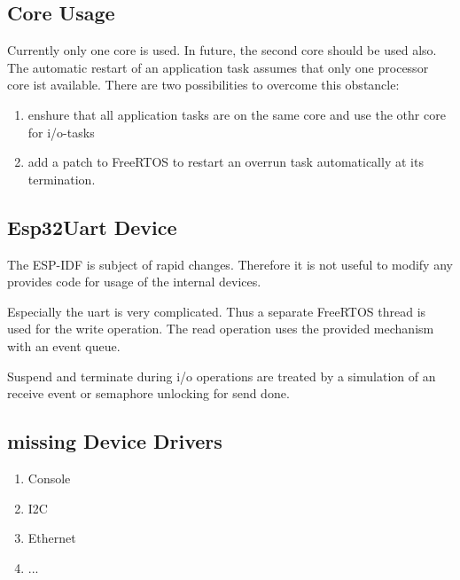 \subsection{Core Usage}
Currently only one core is used.
In future, the second core should be used also.
The automatic restart of an application task assumes that only one processor core ist 
available.
There are two possibilities to overcome this obstancle:
\begin{enumerate}
\item enshure that all application tasks are on the same core and use the othr core for i/o-tasks
\item add a patch to FreeRTOS to restart an overrun task automatically at its termination.
\end{enumerate}

\subsection{Esp32Uart Device}
The ESP-IDF is subject of rapid changes. Therefore it is not 
useful to modify any provides code for usage of the internal devices.

Especially the uart is very complicated. Thus a separate FreeRTOS thread 
is used for the write operation. The read operation uses the 
provided mechanism with an event queue.

Suspend and terminate during i/o operations are treated by a simulation
of an receive event or semaphore unlocking for send done.


\subsection{missing Device Drivers}
\begin{enumerate}
\item Console
\item I2C
\item Ethernet
\item ...
\end{enumerate}


